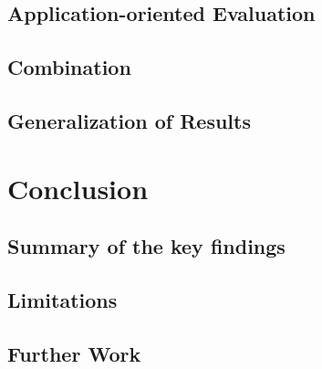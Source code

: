 \documentclass{article}
\begin{document}
\subsection{Application-oriented Evaluation}
\subsection{Combination}
\subsection{Generalization of Results}

\section{Conclusion}
\subsection{Summary of the key findings}
\subsection{Limitations}
\subsection{Further Work}






\appendix
\end{document}
